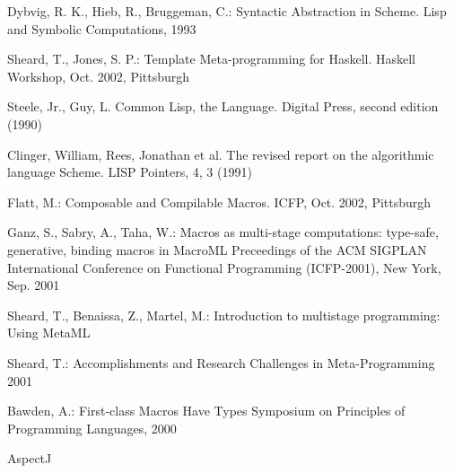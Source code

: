 \documentclass{llncs}
\begin{document}
%
%
\begin{thebibliography}{}
%
Dybvig, R. K., Hieb, R., Bruggeman, C.:
Syntactic Abstraction in Scheme.
Lisp and Symbolic Computations, 1993

Sheard, T., Jones, S. P.:
Template Meta-programming for Haskell.
Haskell Workshop, Oct. 2002, Pittsburgh

Steele, Jr., Guy, L.
Common Lisp, the Language.
Digital Press, second edition (1990)

Clinger, William, Rees, Jonathan et al.
The revised report on the algorithmic language Scheme.
LISP Pointers, 4, 3 (1991)

Flatt, M.:
Composable and Compilable Macros.
ICFP, Oct. 2002, Pittsburgh

Ganz, S., Sabry, A., Taha, W.:
Macros as multi-stage computations: type-safe, generative, binding macros in MacroML
Preceedings of the ACM SIGPLAN International Conference on Functional Programming (ICFP-2001),
New York, Sep. 2001

Sheard, T., Benaissa, Z., Martel, M.:
Introduction to multistage programming: Using MetaML

Sheard, T.:
Accomplishments and Research Challenges in Meta-Programming
2001

Bawden, A.:
First-class Macros Have Types
Symposium on Principles of Programming Languages, 2000

AspectJ

\end{thebibliography}
\end{document}
